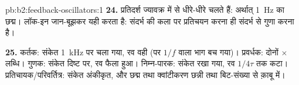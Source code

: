 \begin{solution}{pb:b2:feedback-oscillators:1}
\textbf{24.} प्रतिदर्श ज्यावक्र में से धीरे-धीरे चलते हैं: अर्थात् \qty{1}{Hz} का छद्म।
लॉक-इन जान-बूझकर यही करता है: संदर्भ की कला पर प्रतिचयन करना ही
संदर्भ से गुणा करना है।

\textbf{25.} कर्तक: संकेत \qty{1}{kHz} पर चला गया, रव वही (पर
$1/f$ वाला भाग बच गया)। प्रवर्धक: दोनों $\times$ लब्धि। गुणक: संकेत
दिष्ट पर, रव फैला हुआ। निम्न-पारक: संकेत रखा गया, रव $1/4\tau$ तक कटा।
प्रतिचायक/परिवर्तित्र: संकेत अंकीकृत, और छद्म तथा क्वांटीकरण
छन्नी तथा बिट-संख्या से क़ाबू में।
\end{solution}
